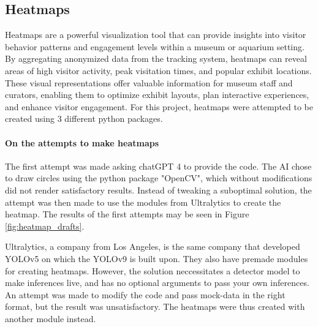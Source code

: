 \subsection{Heatmaps}
\label{sec:heatmaps}
Heatmaps are a powerful visualization tool that can provide insights into visitor behavior patterns and engagement levels within a museum or aquarium setting. By aggregating anonymized data from the tracking system, heatmaps can reveal areas of high visitor activity, peak visitation times, and popular exhibit locations. These visual representations offer valuable information for museum staff and curators, enabling them to optimize exhibit layouts, plan interactive experiences, and enhance visitor engagement. For this project, heatmaps were attempted to be created using 3 different python packages.

\paragraph{On the attempts to make heatmaps}
The first attempt was made asking chatGPT 4 to provide the code. The AI chose to draw circles using the python package "OpenCV", which without modifications did not render satisfactory results. Instead of tweaking a suboptimal solution, the attempt was then made to use the modules from Ultralytics to create the heatmap. The results of the first attempts may be seen in Figure \ref{fig:heatmap_drafts}.

Ultralytics, a company from Los Angeles, is the same company that developed YOLOv5 on which the YOLOv9 is built upon. They also have premade modules for creating heatmaps. However, the solution neccessitates a detector model to make inferences live, and has no optional arguments to pass your own inferences. An attempt was made to modify the code and pass mock-data in the right format, but the result was unsatisfactory. The heatmaps were thus created with another module instead.

